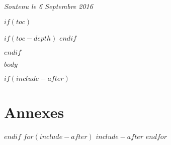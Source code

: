 \documentclass[$if(fontsize)$$fontsize$$endif$]{book} %
\begin{document}
\noindent \textit{Soutenu le 6 Septembre 2016} %


$if(toc)$

\pagestyle{empty} %





\renewcommand\contentsname{Table des Matières}
\renewcommand{\bibname}{Bibliographie}
$if(toc-depth)$
\setcounter{tocdepth}{$toc-depth$}
$endif$
\tableofcontents%


\pagestyle{fancy} %
$endif$


$body$

\appendix

$if(include-after)$
\chapter{Annexes}
$endif$
$for(include-after)$
$include-after$
$endfor$
\end{document}
